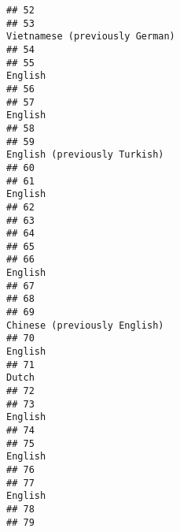\documentclass[
  english,
  man]{apa6}
\begin{document}
\begin{verbatim}
## 52                                                                                         
## 53                                                           Vietnamese (previously German)
## 54                                                                                         
## 55                                                                                  English
## 56                                                                                         
## 57                                                                                  English
## 58                                                                                         
## 59                                                             English (previously Turkish)
## 60                                                                                         
## 61                                                                                  English
## 62                                                                                         
## 63                                                                                         
## 64                                                                                         
## 65                                                                                         
## 66                                                                                  English
## 67                                                                                         
## 68                                                                                         
## 69                                                             Chinese (previously English)
## 70                                                                                  English
## 71                                                                                    Dutch
## 72                                                                                         
## 73                                                                                  English
## 74                                                                                         
## 75                                                                                  English
## 76                                                                                         
## 77                                                                                  English
## 78                                                                                         
## 79                                                                                         

\end{verbatim}
\end{document}
